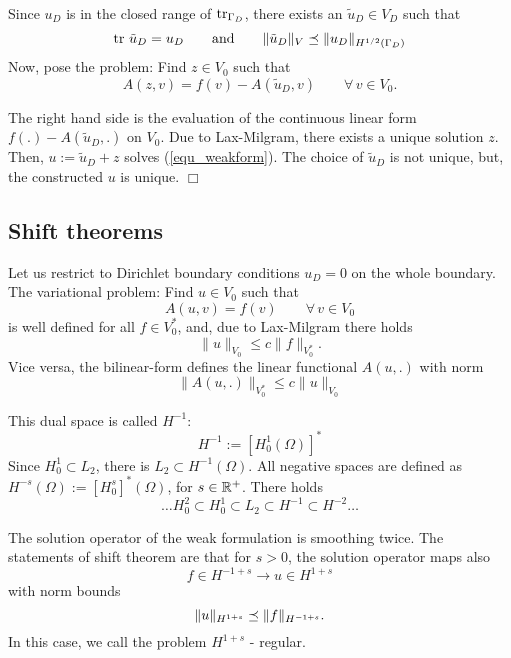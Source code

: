 Since $u_D$ is in the closed range of
$\operatorname{tr}_{\Gamma_D}$, there exists an $\tilde u_D \in V_D$ such that
$$
\operatorname{tr} \, \tilde u_D = u_D \qquad \mbox{and} \qquad \| \tilde u_D \|_V \preceq \| u_D \|_{H^{1/2}(\Gamma_D)}
$$
Now, pose the problem: Find $z \in V_0$ such that
$$
A(z,v) = f(v) - A(\widetilde u_D, v) \qquad \forall \, v \in V_0.
$$

The right hand side is the evaluation of the continuous linear form
$f(.) - A(\widetilde u_D, .)$ on $V_0$. Due to Lax-Milgram, there
exists a unique solution $z$. Then, $u := \widetilde u_D + z$ solves 
(\ref{equ_weakform}). The choice of $\widetilde u_D$ is not unique, but,
the constructed $u$ is unique.
\hfill $\Box$


\subsection{Shift theorems}
%
Let us restrict to Dirichlet boundary conditions $u_D = 0$ on the whole
boundary. The variational problem: Find $u \in V_0$ such that
$$
A(u,v) = f(v) \qquad \forall \, v \in V_0
$$
is well defined for all $f \in V_0^\ast$, and, due to Lax-Milgram there holds
$$
\| u \|_{V_0} \leq c \| f \|_{V_0^\ast}.
$$
Vice versa, the bilinear-form defines the linear functional $A(u,.)$ with
norm 
$$
\| A(u,.) \|_{V_0^\ast}  \leq c \| u \|_{V_0}
$$


This dual space is called $H^{-1}$:
$$
H^{-1} := [H_0^1(\Omega)]^\ast
$$
Since $H_0^1 \subset L_2$, there is $L_2 \subset H^{-1}(\Omega)$. All 
negative spaces are defined as $H^{-s}(\Omega) := [H_0^s]^\ast(\Omega)$, 
for $s \in {\mathbb R}^+$. There holds
$$
\ldots H_0^{2} \subset H_0^{1} \subset L_2 \subset H^{-1} \subset H^{-2} \ldots
$$

The solution operator of the weak formulation is smoothing twice. The
statements of shift theorem are that for $s > 0$, the solution operator 
maps also
$$
f \in H^{-1+s} \rightarrow u \in H^{1+s}
$$
with norm bounds
$$
\| u \|_{H^{1+s}} \preceq \| f \|_{H^{-1+s}}.
$$
In this case, we call the problem $H^{1+s}$ - regular.

